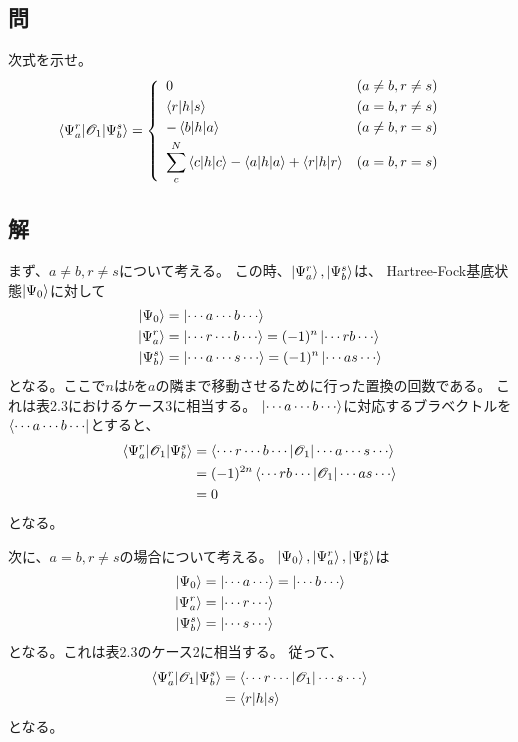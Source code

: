 \subsection{問}
次式を示せ。
\begin{align}
	\braket{\Psi_{a}^{r}|\mathscr{O}_1|\Psi_{b}^{s}}
&=
	\left\{
	\begin{array}{>{\displaystyle}ll}
		0 					& (a\neq b, r\neq s) \\[1mm]
		\braket{r|h|s}		& (a=b, r\neq s) \\[1mm]
		-\braket{b|h|a}		& (a\neq b, r=s) \\[1mm]
		\sum_c^N \braket{c|h|c}
		-
		\braket{a|h|a}
		+
		\braket{r|h|r}		& (a=b, r=s)
	\end{array}
	\right.
\end{align}


\subsection{解}
まず、$a\neq b,r\neq s$について考える。
この時、$\ket{\Psi_{a}^{r}}, \ket{\Psi_{b}^{s}}$は、
Hartree-Fock基底状態$\ket{\Psi_0}$に対して
\begin{align}
	\ket{\Psi_0}
&=
	\ket{\cdots a\cdots b\cdots} \\
%
%
	\ket{\Psi_{a}^{r}}
&=
	\ket{\cdots r\cdots b\cdots}
=
	(-1)^n \ket{\cdots rb\cdots} \\
%
%
	\ket{\Psi_{b}^{s}}
&=
	\ket{\cdots a\cdots s\cdots}
=
	(-1)^n \ket{\cdots as\cdots}
\end{align}
となる。ここで$n$は$b$を$a$の隣まで移動させるために行った置換の回数である。
これは表2.3におけるケース3に相当する。
$\ket{\cdots a\cdots b\cdots}$に対応するブラベクトルを
$\bra{\cdots a\cdots b\cdots}$とすると、
\begin{align}
	\braket{\Psi_{a}^{r}|\mathscr{O}_1|\Psi_{b}^{s}}
&=
	\braket{\cdots r\cdots b\cdots|\mathscr{O}_1|\cdots a\cdots s\cdots} \\
%
%
&=
	(-1)^{2n}
	\braket{\cdots rb\cdots|\mathscr{O}_1|\cdots as\cdots} \\
%
%
&=
	0
\end{align}
となる。

次に、$a=b, r\neq s$の場合について考える。
$\ket{\Psi_0},\ket{\Psi_{a}^{r}},\ket{\Psi_{b}^{s}}$は
\begin{align}
	\ket{\Psi_0}
&=
	\ket{\cdots a\cdots}
=
	\ket{\cdots b\cdots} \\
%
%
	\ket{\Psi_{a}^{r}}
&=
	\ket{\cdots r\cdots} \\
%
%
	\ket{\Psi_{b}^{s}}
&=
	\ket{\cdots s\cdots}
\end{align}
となる。これは表2.3のケース2に相当する。
従って、
\begin{align}
	\braket{\Psi_{a}^{r}|\mathscr{O}_1|\Psi_{b}^{s}}
&=
	\braket{\cdots r\cdots|\mathscr{O}_1|\cdots s\cdots} \\
%
%
&=
	\braket{r|h|s}
\end{align}
となる。

